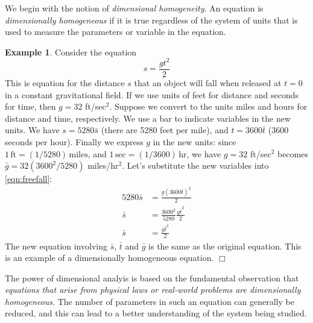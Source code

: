 \documentclass[reqno]{immbook}
\numberwithin{equation}{chapter}
\numberwithin{question}{section}
\numberwithin{theorem}{chapter}
\numberwithin{figure}{chapter}
\theoremstyle{definition}
\newtheorem{example}{Example}[section]
\begin{document}
We begin with the notion of \emph{dimensional
homogeneity}.
An equation is \emph{dimensionally homogeneous}
if it is true regardless of the system
of units that is used to measure the parameters
or variable in the equation.
\begin{example}
Consider the equation
\begin{equation}
   s = \frac{gt^2}{2}
\label{eqn:freefall}
\end{equation}
This is equation for the
distance $s$ that an object will fall when released
at $t=0$ in a constant gravitational field.
If we use units of feet for distance and seconds
for time, then $g=32$ ft/sec$^2$.
Suppose we convert to the units miles and hours
for distance and time, respectively.
We use a bar to indicate variables in the 
new units.  We have $s = 5280\bar{s}$ (there
are 5280 feet per mile), and $t = 3600\bar{t}$
($3600$ seconds per hour).
Finally we express $g$ in the new units:
since $1 \,\textrm{ft} = (1/5280) \,\textrm{miles}$, and
$1 \,\textrm{sec} = (1/3600) \,\textrm{hr}$, we have
$g = 32$ ft/sec$^2$ becomes $\bar{g} = 32 (3600^2/5280)$
miles/hr$^2$.
Let's substitute the new variables into
\eqref{eqn:freefall}:
\begin{equation}
\begin{split}
   5280\bar{s} & = \frac{g\left(3600\bar{t}\right)^2}{2} \\
   \bar{s} & = \frac{3600^2}{5280} \frac{g\bar{t}^2}{2} \\
   \bar{s} & = \frac{\bar{g}\bar{t}^2}{2}
\end{split}
\end{equation}
The new equation involving $\bar{s}$, $\bar{t}$ and $\bar{g}$
is the same as the original equation.
This is an example of a dimensionally homogeneous equation.
\hfill$\Box$
\end{example}

\medskip
The power of dimensional analyis is based on the
fundamental observation that
\emph{equations that arise from physical laws
or real-world problems are dimensionally homogeneous}.
The number of parameters in such an equation can generally
be reduced, and this can lead to a better understanding
of the system being studied.
\end{document}
